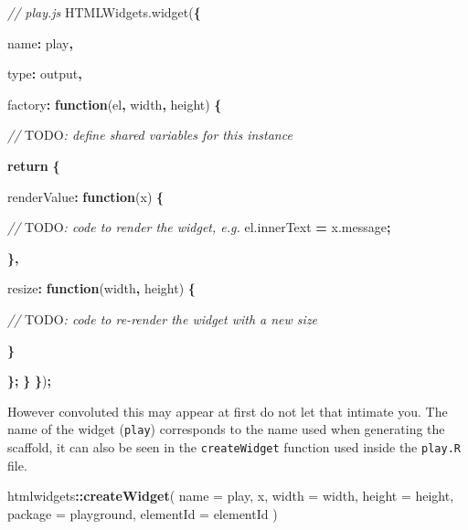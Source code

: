 \documentclass[
]{krantz}
\makeatletter
\newenvironment{Shaded}{\begin{snugshade}}{\end{snugshade}}
\newcommand{\AlertTok}[1]{\textcolor[rgb]{0.33,0.33,0.33}{#1}}
\newcommand{\AttributeTok}[1]{\textcolor[rgb]{0.61,0.61,0.61}{#1}}
\newcommand{\CommentTok}[1]{\textcolor[rgb]{0.37,0.37,0.37}{\textit{#1}}}
\newcommand{\ControlFlowTok}[1]{\textcolor[rgb]{0.27,0.27,0.27}{\textbf{#1}}}
\newcommand{\DataTypeTok}[1]{\textcolor[rgb]{0.27,0.27,0.27}{#1}}
\newcommand{\KeywordTok}[1]{\textcolor[rgb]{0.27,0.27,0.27}{\textbf{#1}}}
\newcommand{\NormalTok}[1]{#1}
\newcommand{\OperatorTok}[1]{\textcolor[rgb]{0.43,0.43,0.43}{\textbf{#1}}}
\newcommand{\StringTok}[1]{\textcolor[rgb]{0.5,0.5,0.5}{#1}}
\newcommand{\VariableTok}[1]{\textcolor[rgb]{0,0,0}{#1}}
\newenvironment{kframe}{%
\medskip{}
\setlength{\fboxsep}{.8em}
 \def\at@end@of@kframe{}%
 \ifinner\ifhmode%
  \def\at@end@of@kframe{\end{minipage}}%
  \begin{minipage}{\columnwidth}%
 \fi\fi%
 \def\FrameCommand##1{\hskip\@totalleftmargin \hskip-\fboxsep
 \colorbox{shadecolor}{##1}\hskip-\fboxsep
     \hskip-\linewidth \hskip-\@totalleftmargin \hskip\columnwidth}%
 \MakeFramed {\advance\hsize-\width
   \@totalleftmargin\z@ \linewidth\hsize
   \@setminipage}}%
 {\par\unskip\endMakeFramed%
 \at@end@of@kframe}
\renewenvironment{Shaded}{\begin{kframe}}{\end{kframe}}
\makeatother
\begin{document}
\begin{Shaded}
\begin{Highlighting}[]
\CommentTok{// play.js}
\VariableTok{HTMLWidgets}\NormalTok{.}\AttributeTok{widget}\NormalTok{(}\OperatorTok{\{}

  \DataTypeTok{name}\OperatorTok{:} \StringTok{\textquotesingle{}play\textquotesingle{}}\OperatorTok{,}

  \DataTypeTok{type}\OperatorTok{:} \StringTok{\textquotesingle{}output\textquotesingle{}}\OperatorTok{,}

  \DataTypeTok{factory}\OperatorTok{:} \KeywordTok{function}\NormalTok{(el}\OperatorTok{,}\NormalTok{ width}\OperatorTok{,}\NormalTok{ height) }\OperatorTok{\{}

    \CommentTok{// }\AlertTok{TODO}\CommentTok{: define shared variables for this instance}

    \ControlFlowTok{return} \OperatorTok{\{}

      \DataTypeTok{renderValue}\OperatorTok{:} \KeywordTok{function}\NormalTok{(x) }\OperatorTok{\{}

        \CommentTok{// }\AlertTok{TODO}\CommentTok{: code to render the widget, e.g.}
        \VariableTok{el}\NormalTok{.}\AttributeTok{innerText} \OperatorTok{=} \VariableTok{x}\NormalTok{.}\AttributeTok{message}\OperatorTok{;}

      \OperatorTok{\},}

      \DataTypeTok{resize}\OperatorTok{:} \KeywordTok{function}\NormalTok{(width}\OperatorTok{,}\NormalTok{ height) }\OperatorTok{\{}

        \CommentTok{// }\AlertTok{TODO}\CommentTok{: code to re{-}render the widget with a new size}

      \OperatorTok{\}}

    \OperatorTok{\};}
  \OperatorTok{\}}
\OperatorTok{\}}\NormalTok{)}\OperatorTok{;}
\end{Highlighting}
\end{Shaded}

However convoluted this may appear at first do not let that intimate you. The name of the widget (\texttt{play}) corresponds to the name used when generating the scaffold, it can also be seen in the \texttt{createWidget} function used inside the \texttt{play.R} file.

\begin{Shaded}
\begin{Highlighting}[]
\NormalTok{htmlwidgets}\OperatorTok{::}\KeywordTok{createWidget}\NormalTok{(}
  \DataTypeTok{name =} \StringTok{\textquotesingle{}play\textquotesingle{}}\NormalTok{,}
\NormalTok{  x,}
  \DataTypeTok{width =}\NormalTok{ width,}
  \DataTypeTok{height =}\NormalTok{ height,}
  \DataTypeTok{package =} \StringTok{\textquotesingle{}playground\textquotesingle{}}\NormalTok{,}
  \DataTypeTok{elementId =}\NormalTok{ elementId}
\NormalTok{)}
\end{Highlighting}
\end{Shaded}
\end{document}
